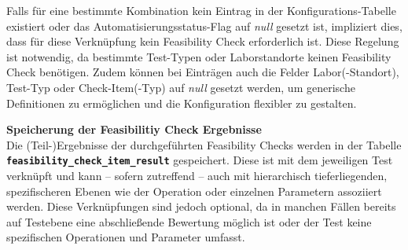 \begin{table}[htbp]
    \centering
    \caption{Spalten der Feasibility Check Konfigurations-Tabelle: \texttt{ctlg\_\-feasibility\_\-config}}
    \footnotesize
    \renewcommand{\arraystretch}{1.2}
    \label{tab:config-fields}
\end{table}

Falls für eine bestimmte Kombination kein Eintrag in der Konfigurations-Tabelle existiert oder das Automatisierungsstatus-Flag auf \textit{null} gesetzt ist, impliziert dies, dass für diese Verknüpfung kein Feasibility Check erforderlich ist. Diese Regelung ist notwendig, da bestimmte Test-Typen oder Laborstandorte keinen Feasibility Check benötigen. Zudem können bei Einträgen auch die Felder Labor(-Standort), Test-Typ oder Check-Item(-Typ) auf \textit{null} gesetzt werden, um generische Definitionen zu ermöglichen und die Konfiguration flexibler zu gestalten.

\textbf{Speicherung der Feasibilitiy Check Ergebnisse} \\
Die (Teil-)Ergebnisse der durchgeführten Feasibility Checks werden in der Tabelle \textbf{\texttt{feasibility\_check\_item\_result}} gespeichert. Diese ist mit dem jeweiligen Test verknüpft und kann – sofern zutreffend – auch mit hierarchisch tieferliegenden, spezifischeren Ebenen wie der Operation oder einzelnen Parametern assoziiert werden. Diese Verknüpfungen sind jedoch optional, da in manchen Fällen bereits auf Test\-ebene eine abschließende Bewertung möglich ist oder der Test keine spezifischen Operationen und Parameter umfasst.

